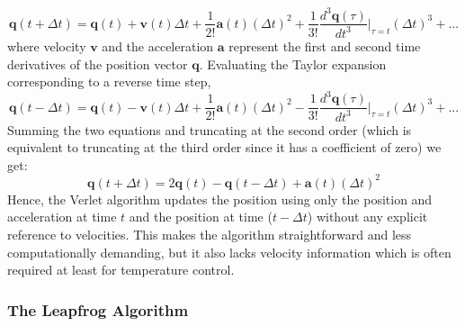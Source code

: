 \documentclass[11pt]{report}
\begin{document}
\begin{equation}
\mathbf{q}(t+\Delta t) = \mathbf{q}(t) + \mathbf{v}(t)\Delta t + \frac{1}{2!} \mathbf{a}(t) (\Delta t)^2 + \frac{1}{3!} \frac{d^{3}\mathbf{q}(\tau)}{dt^3} \Big| _{\tau=t} (\Delta t)^3
+ ...
\end{equation}
where velocity $\mathbf{v}$ and the acceleration $\mathbf{a}$ represent the first and second time derivatives of the 
position vector $\mathbf{q}$. Evaluating the Taylor expansion 
corresponding to a reverse time step,
\begin{equation}
\mathbf{q}(t-\Delta t) = \mathbf{q}(t) - \mathbf{v}(t)\Delta t + \frac{1}{2!} \mathbf{a}(t) (\Delta t)^2 - \frac{1}{3!} \frac{d^{3}\mathbf{q}(\tau)}{dt^3} \Big| _{\tau=t} (\Delta t)^3
+ ...
\end{equation}
Summing the two equations and truncating at the second order
(which is equivalent to truncating at the third order
since it has a coefficient of zero) we get:
\begin{equation}
\mathbf{q}(t+\Delta t) = 2 \mathbf{q}(t) - \mathbf{q}(t-\Delta t) + \mathbf{a}(t)(\Delta t)^2
\end{equation}
Hence, the Verlet algorithm updates the position using only
the position and acceleration at time $t$ and the position
at time ($t-\Delta t$) without any explicit reference
to velocities. This makes the algorithm straightforward and
less computationally demanding, but it also lacks velocity 
information which is often required at least for
temperature control.

\subsubsection{The Leapfrog Algorithm}
\end{document}
